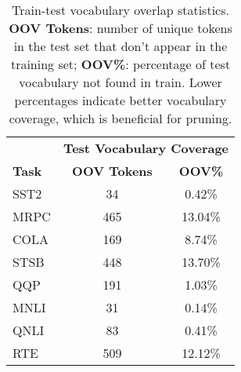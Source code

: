 \begin{table}[htbp]
\centering
\scriptsize
\setlength{\tabcolsep}{4pt}
\begin{tabular}{l|cc}
\toprule
& \multicolumn{2}{c}{\textbf{Test Vocabulary Coverage}} \\
\textbf{Task} & \textbf{OOV Tokens} & \textbf{OOV\%} \\
\midrule
SST2 & 34 & 0.42\% \\
MRPC & 465 & 13.04\% \\
COLA & 169 & 8.74\% \\
STSB & 448 & 13.70\% \\
QQP & 191 & 1.03\% \\
MNLI & 31 & 0.14\% \\
QNLI & 83 & 0.41\% \\
RTE & 509 & 12.12\% \\
\bottomrule
\end{tabular}
\caption{Train-test vocabulary overlap statistics. \textbf{OOV Tokens}: number of unique tokens in the test set that don't appear in the training set; \textbf{OOV\%}: percentage of test vocabulary not found in train. Lower percentages indicate better vocabulary coverage, which is beneficial for pruning.}
\label{tab:vocab_overlap}
\end{table} 
